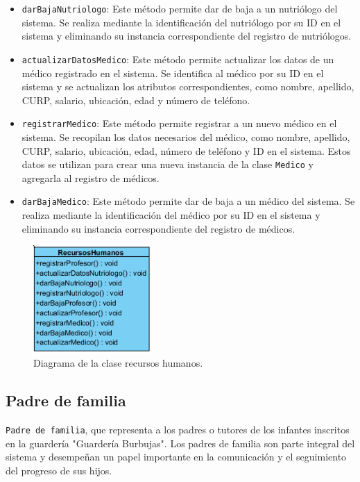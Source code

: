 \begin{itemize}
\item \texttt{darBajaNutriologo}: Este método permite dar de baja a un nutriólogo del sistema. Se realiza mediante la identificación del nutriólogo por su ID en el sistema y eliminando su instancia correspondiente del registro de nutriólogos.

\item \texttt{actualizarDatosMedico}: Este método permite actualizar los datos de un médico registrado en el sistema. Se identifica al médico por su ID en el sistema y se actualizan los atributos correspondientes, como nombre, apellido, CURP, salario, ubicación, edad y número de teléfono.

\item \texttt{registrarMedico}: Este método permite registrar a un nuevo médico en el sistema. Se recopilan los datos necesarios del médico, como nombre, apellido, CURP, salario, ubicación, edad, número de teléfono y ID en el sistema. Estos datos se utilizan para crear una nueva instancia de la clase \texttt{Medico} y agregarla al registro de médicos.

\item \texttt{darBajaMedico}: Este método permite dar de baja a un médico del sistema. Se realiza mediante la identificación del médico por su ID en el sistema y eliminando su instancia correspondiente del registro de médicos.
\end{itemize}

\begin{figure}[htbp]
\centering
\includegraphics[width=0.4\textwidth]{images/arqui/recursoshumanos.png}
\caption{Diagrama de la clase recursos humanos.}
\label{fig:entidadRH}
\end{figure}

\clearpage
\subsection{Padre de familia}
\texttt{Padre de familia}, que representa a los padres o tutores de los infantes inscritos en la guardería "Guardería Burbujas". Los padres de familia son parte integral del sistema y desempeñan un papel importante en la comunicación y el seguimiento del progreso de sus hijos.

